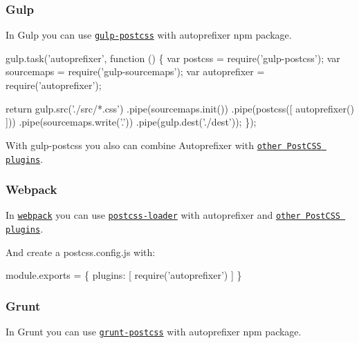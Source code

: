 \subsubsection*{Gulp}

In Gulp you can use \href{https://github.com/postcss/gulp-postcss}{\tt gulp-\/postcss} with {\ttfamily autoprefixer} npm package.


\begin{DoxyCode}
gulp.task('autoprefixer', function () \{
    var postcss      = require('gulp-postcss');
    var sourcemaps   = require('gulp-sourcemaps');
    var autoprefixer = require('autoprefixer');

    return gulp.src('./src/*.css')
        .pipe(sourcemaps.init())
        .pipe(postcss([ autoprefixer() ]))
        .pipe(sourcemaps.write('.'))
        .pipe(gulp.dest('./dest'));
\});
\end{DoxyCode}


With {\ttfamily gulp-\/postcss} you also can combine Autoprefixer with \href{https://github.com/postcss/postcss#plugins}{\tt other Post\+C\+SS plugins}.

\subsubsection*{Webpack}

In \href{http://webpack.github.io/}{\tt webpack} you can use \href{https://github.com/postcss/postcss-loader}{\tt postcss-\/loader} with {\ttfamily autoprefixer} and \href{https://github.com/postcss/postcss#plugins}{\tt other Post\+C\+SS plugins}.




And create a {\ttfamily postcss.\+config.\+js} with\+:


\begin{DoxyCode}
module.exports = \{
  plugins: [
    require('autoprefixer')
  ]
\}
\end{DoxyCode}


\subsubsection*{Grunt}

In Grunt you can use \href{https://github.com/nDmitry/grunt-postcss}{\tt grunt-\/postcss} with {\ttfamily autoprefixer} npm package.


